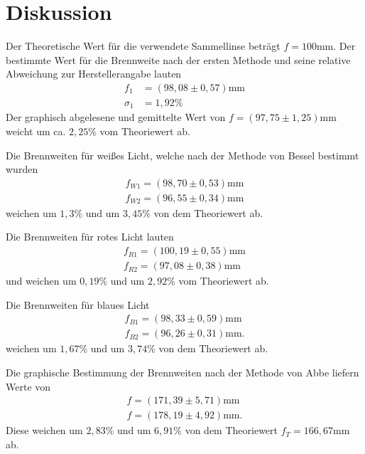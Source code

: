 \section{Diskussion}
\label{sec:Diskussion}

Der Theoretische Wert für die verwendete Sammellinse beträgt $f=100\si{\milli\meter}$.
Der bestimmte Wert für die Brennweite nach der ersten Methode und seine relative Abweichung zur Herstellerangabe lauten
\begin{align*}
f_1 &= (98,08 \pm 0,57) \si{\milli\meter}\\
\sigma_1 &= 1,92 \%
\end{align*}
Der graphisch abgelesene und gemittelte Wert von $f = (97,75 \pm 1,25)\si{\milli\meter}$ weicht um ca. $2,25 \%$ vom Theoriewert ab.


Die Brennweiten für weißes Licht, welche nach der Methode von Bessel bestimmt wurden 
\begin{align*}
f_{W1} = (98,70 \pm 0,53) \si{\milli\meter} \\
f_{W2} = (96,55 \pm 0,34) \si{\milli\meter} 
\end{align*}
weichen um $1,3 \%$ und um $3,45 \%$ von dem Theoriewert ab. 

Die Brennweiten für rotes Licht lauten
\begin{align*}
f_{R1} = (100,19 \pm 0,55) \si{\milli\meter} \\
f_{R2} = (97,08 \pm 0,38) \si{\milli\meter} 
\end{align*}
und weichen um $0,19 \%$ und um $2,92 \%$ vom Theoriewert ab.

Die Brennweiten für blaues Licht
\begin{align*}
f_{B1} = (98,33 \pm 0,59) \si{\milli\meter} \\
f_{B2} = (96,26 \pm 0,31) \si{\milli\meter} .
\end{align*}
weichen um $1,67 \%$ und um $3,74 \%$ von dem Theoriewert ab.

Die graphische Bestimmung der Brennweiten nach der Methode von Abbe liefern Werte von 
\begin{align*}
f = (171,39 \pm 5,71)\si{\milli\meter} \\
f = (178,19 \pm 4,92)\si{\milli\meter}.
\end{align*}
Diese weichen um $2,83 \%$ und um $6,91 \%$ von dem Theoriewert $f_T = 166,67 \si{\milli\meter}$ ab.

